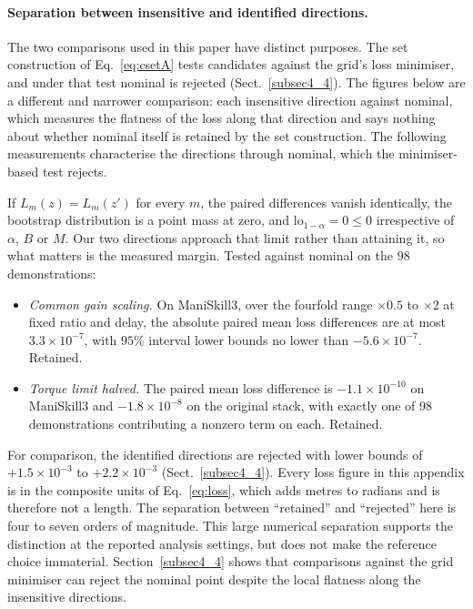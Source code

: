 \documentclass[pdflatex,iicol,sn-apa]{sn-jnl}
\theoremstyle{remark}
\begin{document}
\begin{appendices}
\paragraph{Separation between insensitive and identified directions.}
The two comparisons used in this paper have distinct purposes. The set construction of
Eq.~\eqref{eq:csetA} tests candidates against the grid's
loss minimiser, and under that test nominal is rejected (Sect.~\ref{subsec4_4}). The figures
below are a different and narrower comparison: each insensitive direction against nominal,
which measures the flatness of the loss along that direction and says nothing about whether nominal
itself is retained by the set construction. The following measurements characterise the
directions through nominal, which the minimiser-based test rejects.

If $L_m(z) = L_m(z')$ for every $m$, the paired differences vanish identically, the bootstrap
distribution is a point mass at zero, and $\mathrm{lo}_{1-\alpha} = 0 \le 0$ irrespective of $\alpha$,
$B$ or $M$. Our two directions approach that limit rather than attaining it, so what matters is the
measured margin. Tested against nominal on the 98 demonstrations:

\begin{itemize}
\item \emph{Common gain scaling.} On ManiSkill3, over the fourfold range $\times 0.5$ to $\times 2$
at fixed ratio and delay, the absolute paired mean loss differences are at most $3.3\times10^{-7}$,
with $95\%$ interval lower bounds no lower than $-5.6\times10^{-7}$. Retained.
\item \emph{Torque limit halved.} The paired mean loss difference is $-1.1\times10^{-10}$ on
ManiSkill3 and $-1.8\times10^{-8}$ on the original stack, with exactly one of 98 demonstrations
contributing a nonzero term on each. Retained.
\end{itemize}

\noindent For comparison, the identified directions are rejected with lower bounds of
$+1.5\times10^{-3}$ to $+2.2\times10^{-3}$ (Sect.~\ref{subsec4_4}). Every loss figure in this
appendix is in the composite units of Eq.~\eqref{eq:loss}, which adds metres to radians and is
therefore not a length. The separation between
``retained'' and ``rejected'' here is four to seven orders of magnitude. This large numerical
separation supports the distinction at the reported analysis settings, but does not make the
reference choice immaterial. Section~\ref{subsec4_4} shows that comparisons against the grid
minimiser can reject the nominal point despite the local flatness along the insensitive
directions.


\end{appendices}
\end{document}
